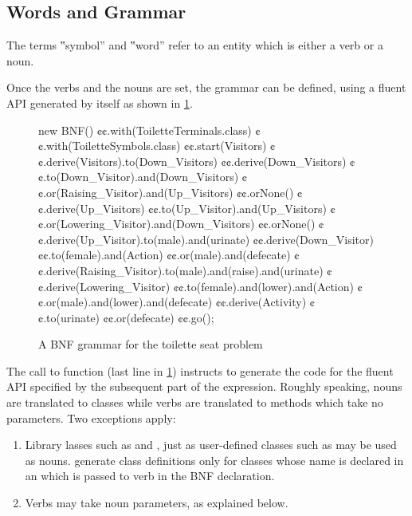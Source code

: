 \subsection{Words and Grammar}
The terms ‟symbol” and ‟word” refer to an entity which is either
  a verb or a noun.

Once the verbs and the nouns are set, the grammar can be defined,
  using a fluent API generated by \SELF itself as shown
  in \cref{Figure:fluent}.

\begin{figure}[htbp]
  \begin{JAVA}[style=numbered]
new BNF()
  ¢¢.with(ToiletteTerminals.class)
  ¢¢.with(ToiletteSymbols.class)
  ¢¢.start(Visitors)
  ¢¢.derive(Visitors).to(Down_Visitors)
  ¢¢.derive(Down_Visitors)
    ¢¢.to(Down_Visitor).and(Down_Visitors)
    ¢¢.or(Raising_Visitor).and(Up_Visitors)
    ¢¢.orNone()
  ¢¢.derive(Up_Visitors)
    ¢¢.to(Up_Visitor).and(Up_Visitors)
    ¢¢.or(Lowering_Visitor).and(Down_Visitors)
    ¢¢.orNone()
  ¢¢.derive(Up_Visitor).to(male).and(urinate)
  ¢¢.derive(Down_Visitor)
    ¢¢.to(female).and(Action)
    ¢¢.or(male).and(defecate)
  ¢¢.derive(Raising_Visitor).to(male).and(raise).and(urinate)
  ¢¢.derive(Lowering_Visitor)
    ¢¢.to(female).and(lower).and(Action)
    ¢¢.or(male).and(lower).and(defecate)
  ¢¢.derive(Activity)
    ¢¢.to(urinate)
    ¢¢.or(defecate)
  ¢¢.go();\end{JAVA}
  \caption{A BNF grammar for the toilette seat problem}
  \label{Figure:fluent}
\end{figure}

The call to function  (last line in \cref{Figure:fluent}) instructs
  \SELF to generate the code for the fluent API specified by the
  subsequent part of the expression.
Roughly speaking, nouns are translated to classes while verbs are translated to methods which
  take no parameters.
Two exceptions apply:
\begin{enumerate}
  \item 
    Library lasses such as  and , just as user-defined
    classes such as  may be used as nouns. 
    \SELF generate class definitions only for classes whose name is declared 
    in an  which is passed to  verb in the BNF declaration.
  \item Verbs may take noun parameters, as explained below.
\end{enumerate}
